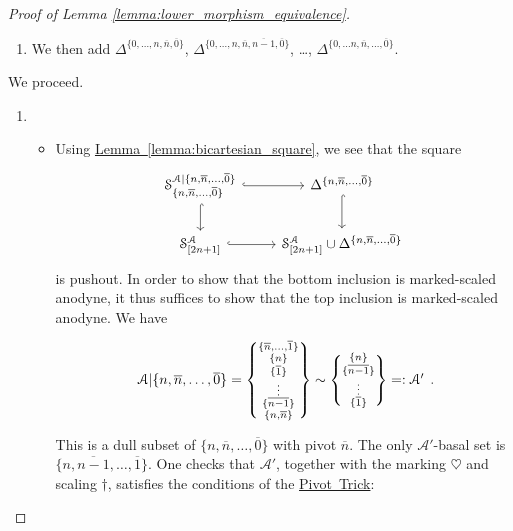 \documentclass[main.tex]{subfiles}
\begin{document}
\begin{proof}[Proof of Lemma \ref{lemma:lower_morphism_equivalence}]
\begin{enumerate}
    \item We then add $\Delta^{\{0, \ldots, n, \overline{n}, \overline{0}\}}$, $\Delta^{\{0, \ldots, n, \overline{n}, \overline{n-1}, \overline{0}\}}$, \dots, $\Delta^{\{0, \ldots n, \overline{n}, \ldots, \overline{0}\}}$.
  \end{enumerate}
  We proceed.
  \begin{enumerate}
    \item
      \begin{itemize}
        \item Using \hyperref[lemma:bicartesian_square]{Lemma~\ref*{lemma:bicartesian_square}}, we see that the square
          \begin{equation*}
            \begin{tikzcd}
              \S^{\mathcal{A}|\{n, \overline{n}, \ldots, \overline{0}\}}_{\{n, \overline{n}, \ldots, \overline{0}\}}
              \arrow[r, hook]
              \arrow[d, hook]
              & \Delta^{\{n, \overline{n}, \ldots, \overline{0}\}}
              \arrow[d, hook]
              \\
              \S^{\mathcal{A}}_{[2n+1]}
              \arrow[r, hook]
              & \S^{\mathcal{A}}_{[2n+1]} \cup \Delta^{\{n, \overline{n}, \ldots, \overline{0}\}}
            \end{tikzcd}
          \end{equation*}
          is pushout. In order to show that the bottom inclusion is marked-scaled anodyne, it thus suffices to show that the top inclusion is marked-scaled anodyne. We have
          \begin{equation*}
            \begin{tikzcd}
              \mathcal{A}|\{n, \overline{n}, \ldots, \overline{0}\}
              = \left\{ \substack{ \{\overline{n}, \ldots, \overline{1}\} \\ \{n\} \\ \{\overline{1}\} \\ \vdots \\ \{\overline{n-1}\} \\ \{n, \overline{n}\} } \right\}
              \sim \left\{ \substack{ \{n\} \\ \{\overline{n-1}\} \\ \vdots \\ \{\overline{1}\} } \right\} =: \mathcal{A}'
            \end{tikzcd}.
          \end{equation*}
          This is a dull subset of $\{n, \overline{n}, \ldots, \overline{0}\}$ with pivot $\overline{n}$. The only $\mathcal{A}'$-basal set is $\{n, \overline{n-1}, \ldots, \overline{1}\}$. One checks that $\mathcal{A}'$, together with the marking $\heartsuit$ and scaling $\dagger$, satisfies the conditions of the \hyperref[lemma:pivot_trick]{Pivot~Trick}:

\end{itemize}
\end{enumerate}
\end{proof}
\end{document}
